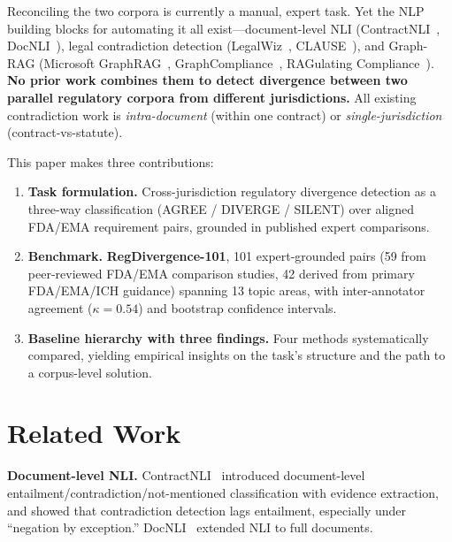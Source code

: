 \documentclass[sigconf]{acmart}
\begin{document}
Reconciling the two corpora is currently a manual, expert task. Yet the NLP
building blocks for automating it all exist---document-level NLI
(ContractNLI~\cite{koreeda2021contractnli}, DocNLI~\cite{yin2021docnli}),
legal contradiction detection (LegalWiz~\cite{legalwiz2025},
CLAUSE~\cite{betterclause2026}), and Graph-RAG (Microsoft
GraphRAG~\cite{edge2024graphrag}, GraphCompliance~\cite{graphcompliance2025},
RAGulating Compliance~\cite{ragulating2025}). \textbf{No prior work combines
them to detect divergence between two parallel regulatory corpora from different
jurisdictions.} All existing contradiction work is \textit{intra-document}
(within one contract) or \textit{single-jurisdiction} (contract-vs-statute).

This paper makes three contributions:
\begin{enumerate}
\item \textbf{Task formulation.} Cross-jurisdiction regulatory divergence
  detection as a three-way classification (AGREE / DIVERGE / SILENT) over
  aligned FDA/EMA requirement pairs, grounded in published expert comparisons.
\item \textbf{Benchmark.} \textbf{RegDivergence-101}, 101 expert-grounded
  pairs (59 from peer-reviewed FDA/EMA comparison studies, 42 derived from
  primary FDA/EMA/ICH guidance) spanning 13 topic areas, with inter-annotator
  agreement ($\kappa = 0.54$) and bootstrap confidence intervals.
\item \textbf{Baseline hierarchy with three findings.} Four methods
  systematically compared, yielding empirical insights on the task's structure
  and the path to a corpus-level solution.
\end{enumerate}

\section{Related Work}

\textbf{Document-level NLI.} ContractNLI~\cite{koreeda2021contractnli} introduced
document-level entailment/contradiction/not-mentioned classification with
evidence extraction, and showed that contradiction detection lags entailment,
especially under ``negation by exception.'' DocNLI~\cite{yin2021docnli} extended
NLI to full documents.
\end{document}
